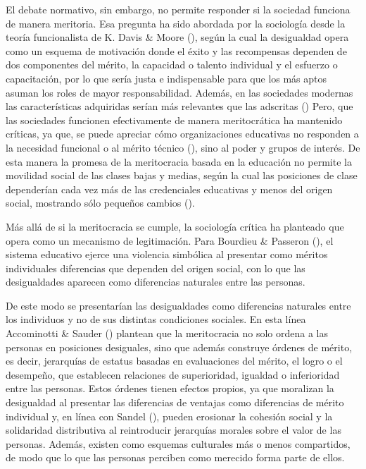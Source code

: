 \documentclass[
  spanish,
  a4paper,
  oneside]{scrbook}
\begin{document}
El debate normativo, sin embargo, no permite responder si la sociedad
funciona de manera meritoria. Esa pregunta ha sido abordada por la
sociología desde la teoría funcionalista de K. Davis \& Moore
(), según la cual la desigualdad
opera como un esquema de motivación donde el éxito y las recompensas
dependen de dos componentes del mérito, la capacidad o talento
individual y el esfuerzo o capacitación, por lo que sería justa e
indispensable para que los más aptos asuman los roles de mayor
responsabilidad. Además, en las sociedades modernas las características
adquiridas serían más relevantes que las adscritas
() Pero, que las
sociedades funcionen efectivamente de manera meritocrática ha mantenido
críticas, ya que, se puede apreciar cómo organizaciones educativas no
responden a la necesidad funcional o al mérito técnico
(), sino al poder y
grupos de interés. De esta manera la promesa de la meritocracia basada
en la educación no permite la movilidad social de las clases bajas y
medias, según la cual las posiciones de clase dependerían cada vez más
de las credenciales educativas y menos del origen social, mostrando sólo
pequeños cambios ().

Más allá de si la meritocracia se cumple, la sociología crítica ha
planteado que opera como un mecanismo de legitimación. Para Bourdieu \&
Passeron (), el sistema
educativo ejerce una violencia simbólica al presentar como méritos
individuales diferencias que dependen del origen social, con lo que las
desigualdades aparecen como diferencias naturales entre las personas.

De este modo se presentarían las desigualdades como diferencias
naturales entre los individuos y no de sus distintas condiciones
sociales. En esta línea Accominotti \& Sauder
() plantean que la
meritocracia no solo ordena a las personas en posiciones desiguales,
sino que además construye órdenes de mérito, es decir, jerarquías de
estatus basadas en evaluaciones del mérito, el logro o el desempeño, que
establecen relaciones de superioridad, igualdad o inferioridad entre las
personas. Estos órdenes tienen efectos propios, ya que moralizan la
desigualdad al presentar las diferencias de ventajas como diferencias de
mérito individual y, en línea con Sandel
(), pueden erosionar la cohesión
social y la solidaridad distributiva al reintroducir jerarquías morales
sobre el valor de las personas. Además, existen como esquemas culturales
más o menos compartidos, de modo que lo que las personas perciben como
merecido forma parte de ellos.
\end{document}
